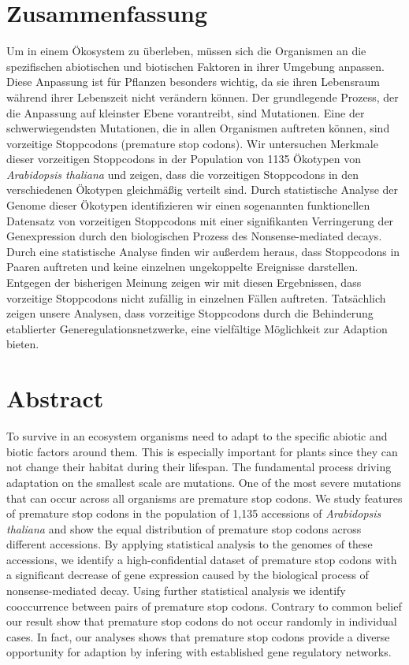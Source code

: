 \documentclass[english,onecolumn]{scrreprt}
\begin{document}
\chapter*{Zusammenfassung}
Um in einem Ökosystem zu überleben, müssen sich die Organismen an die spezifischen abiotischen und biotischen Faktoren in ihrer Umgebung anpassen. Diese Anpassung ist für Pflanzen besonders wichtig, da sie ihren Lebensraum während ihrer Lebenszeit nicht verändern können. Der grundlegende Prozess, der die Anpassung auf kleinster Ebene vorantreibt, sind Mutationen. Eine der schwerwiegendsten Mutationen, die in allen Organismen auftreten können, sind vorzeitige Stoppcodons (premature stop codons). Wir untersuchen Merkmale dieser vorzeitigen Stoppcodons in der Population von 1135 Ökotypen von \textit{Arabidopsis thaliana} und zeigen, dass die vorzeitigen Stoppcodons in den verschiedenen Ökotypen gleichmäßig verteilt sind. Durch statistische Analyse der Genome dieser Ökotypen identifizieren wir einen sogenannten funktionellen Datensatz von vorzeitigen Stoppcodons mit einer signifikanten Verringerung der Genexpression durch den biologischen Prozess des Nonsense-mediated decays. Durch eine statistische Analyse finden wir außerdem heraus, dass Stoppcodons in Paaren auftreten und keine einzelnen ungekoppelte Ereignisse darstellen. Entgegen der bisherigen Meinung zeigen wir mit diesen Ergebnissen, dass vorzeitige Stoppcodons nicht zufällig in einzelnen Fällen auftreten. Tatsächlich zeigen unsere Analysen, dass vorzeitige Stoppcodons durch die Behinderung etablierter Generegulationsnetzwerke, eine vielfältige Möglichkeit zur Adaption bieten. 

\chapter*{Abstract}
To survive in an ecosystem organisms need to adapt to the specific abiotic and biotic factors around them. This is especially important for plants since they can not change their habitat during their lifespan. The fundamental process driving adaptation on the smallest scale are mutations. One of the most severe mutations that can occur across all organisms are premature stop codons. We study features of premature stop codons in the population of 1,135 accessions of \textit{Arabidopsis thaliana} and show the equal distribution of premature stop codons across different accessions. By applying statistical analysis to the genomes of these accessions, we identify a high-confidential dataset of premature stop codons with a significant decrease of gene expression caused by the biological process of nonsense-mediated decay. Using further statistical analysis we identify cooccurrence between pairs of premature stop codons. Contrary to common belief our result show that premature stop codons do not occur randomly in individual cases. In fact, our analyses shows that premature stop codons provide a diverse opportunity for adaption by infering with established gene regulatory networks.
\end{document}
